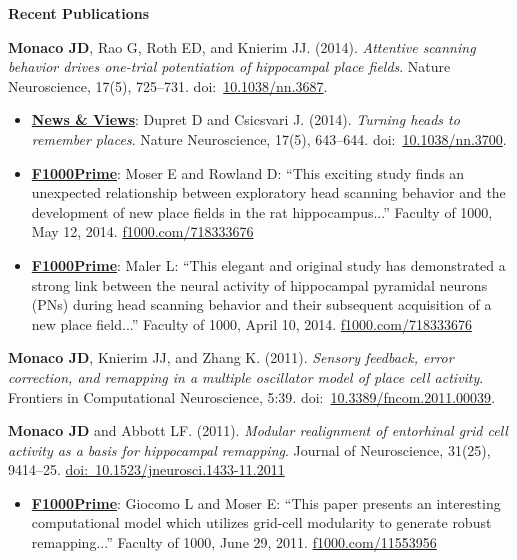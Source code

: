 \documentclass[10pt]{article}
\begin{document}
\vspace{0.1in}

{\large \textbf{Recent Publications}}

\begin{description}
\item \textbf{Monaco JD}, Rao G, Roth ED, and Knierim JJ. (2014). \emph{Attentive scanning behavior drives one-trial potentiation of hippocampal place fields}. Nature Neuroscience, 17(5), 725--731. doi:~\href{http://dx.doi.org/10.1038/nn.3687}{10.1038/nn.3687}.
\begin{itemize}
  \item \underline{\bf News \& Views}: Dupret D and Csicsvari J. (2014). \emph{Turning heads to remember places}. Nature Neuroscience, 17(5), 643--644. doi:~\href{http://dx.doi.org/10.1038/nn.3700}{10.1038/nn.3700}.
  \item \underline{\bf F1000Prime}: Moser E and Rowland D: ``This exciting study finds an unexpected relationship between exploratory head scanning behavior and the development of new place fields in the rat hippocampus...'' Faculty of 1000, May 12, 2014. \href{http://f1000prime.com/718333676#eval793494783}{f1000.com/718333676}
  \item \underline{\bf F1000Prime}: Maler L: ``This elegant and original study has demonstrated a strong link between the neural activity of hippocampal pyramidal neurons (PNs) during head scanning behavior and their subsequent acquisition of a new place field...'' Faculty of 1000, April 10, 2014. \href{http://f1000prime.com/718333676#eval793493493}{f1000.com/718333676}
\end{itemize}
\item \textbf{Monaco JD}, Knierim JJ, and Zhang K. (2011). \emph{Sensory feedback, error correction, and remapping in a multiple oscillator model of place cell activity}. Frontiers in Computational Neuroscience, 5:39. doi:~\href{http://dx.doi.org/10.3389/fncom.2011.00039}{10.3389/fncom.2011.00039}.
\item \textbf{Monaco JD} and Abbott LF. (2011). \emph{Modular realignment of entorhinal grid cell activity as a basis for hippocampal remapping}. Journal of Neuroscience, 31(25), 9414--25. \href{http://dx.doi.org/10.1523/JNEUROSCI.1433-11.2011}{doi:~10.1523/jneurosci.1433-11.2011}
\begin{itemize}
    \item \underline{\bf F1000Prime}: Giocomo L and Moser E: ``This paper presents an interesting computational model which utilizes grid-cell modularity to generate robust remapping...'' Faculty of 1000, June 29, 2011. \href{http://f1000.com/11553956}{f1000.com/11553956}
\end{itemize}
\end{description}
\end{document}

